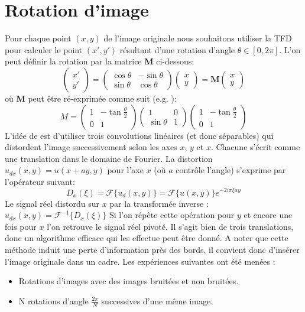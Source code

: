 \documentclass[12pt]{article}
\begin{document}
\section{Rotation d'image}
Pour chaque point $(x, y)$ de l'image originale nous souhaitons utiliser la TFD pour calculer le point $(x', y')$ résultant d'une rotation d'angle  $\theta \in {[0, 2\pi]}$. L'on peut définir la rotation par la matrice \textbf{M} ci-dessous:
$$\begin{pmatrix}
x' \\ y'
\end{pmatrix}=
\begin{pmatrix}
\cos \theta & -\sin \theta \\
\sin \theta & \cos \theta
\end{pmatrix}
\begin{pmatrix}
x \\ y
\end{pmatrix}=\textbf{M}
\begin{pmatrix}
x \\ y
\end{pmatrix}
$$
où \textbf{M} peut être ré-exprimée comme suit (e.g. \cite{paeth86}):
$$M =
\begin{pmatrix}
1 & -\tan \frac{\theta}{2} \\
0 & 1
\end{pmatrix}
\begin{pmatrix}
1 & 0 \\
\sin \theta & 1
\end{pmatrix}
\begin{pmatrix}
1 & -\tan \frac{\theta }{2}\\
0 & 1
\end{pmatrix}
$$
L'idée de \cite{unser95} \cite{larkin97} est d'utiliser trois convolutions linéaires (et donc séparables) qui distordent l'image successivement selon les axes $x$, $y$ et $x$. 
Chacune s'écrit comme une translation dans le domaine de Fourier. La distortion $u_{dx}(x, y) = u(x + ay, y)$ pour l'axe $x$ (où $a$ contrôle l'angle) s'exprime par l'opérateur suivant:
$$ D_x(\xi) = \mathcal{F}\{u_d(x, y)\} = \mathcal{F}\{u(x, y)\} e^{-2 i \pi \xi a y}$$
Le signal réel distordu sur $x$ par la transformée inverse : $ u_{dx}(x, y) = \mathcal{F}^{-1}\{D_x(\xi) \} $ \newline
Si l'on répête cette opération pour $y$ et encore une fois pour $x$ l'on retrouve le signal réel pivoté. Il s'agit bien de trois translations, donc un algorithme efficace qui les effectue peut être donné. A noter que cette méthode induit une perte d'information près des bords, il convient donc d'insérer l'image originale dans un cadre. \newline
Les expériences suivantes ont été menées : 
\begin{itemize}
\item Rotations d'images avec des images bruitées et non bruitées.
\item N rotations d'angle $\frac{2\pi}{N}$ successives d'une même image. 
\end{itemize}
\end{document}
